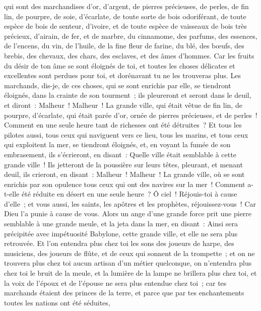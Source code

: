 \begin{multicols}{2}
qui sont des marchandises d'or, d'argent, de pierres précieuses, de perles, de fin lin, de pourpre, de soie, d'écarlate, de toute sorte de bois odoriférant, de toute espèce de bois de senteur, d'ivoire, et de toute espèce de vaisseaux de bois très précieux, d'airain, de fer, et de marbre,
du cinnamome, des parfums, des essences, de l'encens, du vin, de l'huile, de la fine fleur de farine, du blé, des bœufs, des brebis, des chevaux, des chars, des esclaves, et des âmes d'hommes.
Car les fruits du désir de ton âme se sont éloignés de toi, et toutes les choses délicates et excellentes sont perdues pour toi, et dorénavant tu ne les trouveras plus.
Les marchands, dis-je, de ces choses, qui se sont enrichis par elle, se tiendront éloignés, dans la crainte de son tourment~; ils pleureront et seront dans le deuil,
et diront~: Malheur~! Malheur~! La grande ville, qui était vêtue de fin lin, de pourpre, d'écarlate, qui était parée d'or, ornée de pierres précieuses, et de perles~! Comment en une seule heure tant de richesses ont été détruites~?
Et tous les pilotes aussi, tous ceux qui naviguent vers ce lieu, tous les marins, et tous ceux qui exploitent la mer, se tiendront éloignés,
et, en voyant la fumée de son embrasement, ils s'écrieront, en disant~: Quelle ville était semblable à cette grande ville~!
Ils jetteront de la poussière sur leurs têtes, pleurant, et menant deuil, ils crieront, en disant~: Malheur~! Malheur~! La grande ville, où se sont enrichis par son opulence tous ceux qui ont des navires sur la mer~! Comment a-t-elle été réduite en désert en une seule heure~?
Ô ciel~! Réjouis-toi à cause d'elle~; et vous aussi, les saints, les apôtres et les prophètes, réjouissez-vous~! Car Dieu l'a punie à cause de vous.
Alors un ange d'une grande force prit une pierre semblable à une grande meule, et la jeta dans la mer, en disant~: Ainsi sera précipitée avec impétuosité Babylone, cette grande ville, et elle ne sera plus retrouvée.
Et l'on entendra plus chez toi les sons des joueurs de harpe, des musiciens, des joueurs de flûte, et de ceux qui sonnent de la trompette~; et on ne trouvera plus chez toi aucun artisan d'un métier quelconque, on n'entendra plus chez toi le bruit de la meule,
et la lumière de la lampe ne brillera plus chez toi, et la voix de l'époux et de l'épouse ne sera plus entendue chez toi~; car tes marchands étaient des princes de la terre, et parce que par tes enchantements toutes les nations ont été séduites,

\end{multicols}
